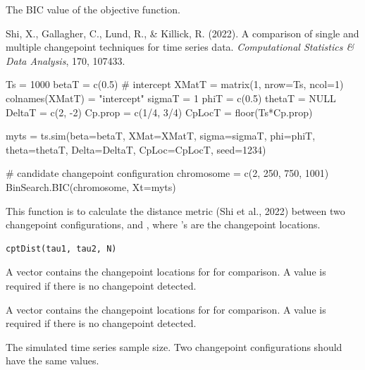 \documentclass[a4paper]{book}
\begin{document}
%
\begin{Value}
The BIC value of the objective function.
\end{Value}
%
\begin{References}

Shi, X., Gallagher, C., Lund, R., \& Killick, R. (2022).
A comparison of single and multiple changepoint techniques for time series data.
\emph{Computational Statistics \& Data Analysis}, 170, 107433.

\end{References}
%
\begin{Examples}
\begin{ExampleCode}
Ts = 1000
betaT = c(0.5) # intercept
XMatT = matrix(1, nrow=Ts, ncol=1)
colnames(XMatT) = "intercept"
sigmaT = 1
phiT = c(0.5)
thetaT = NULL
DeltaT = c(2, -2)
Cp.prop = c(1/4, 3/4)
CpLocT = floor(Ts*Cp.prop)

myts = ts.sim(beta=betaT, XMat=XMatT, sigma=sigmaT, phi=phiT, theta=thetaT,
              Delta=DeltaT, CpLoc=CpLocT, seed=1234)

# candidate changepoint configuration
chromosome = c(2, 250, 750, 1001)
BinSearch.BIC(chromosome, Xt=myts)
\end{ExampleCode}
\end{Examples}
%
\begin{Description}
This function is to calculate the distance metric (Shi et al., 2022) between
two changepoint configurations, 
and , where \eqn{\tau}{}'s are the
changepoint locations.
\end{Description}
%
\begin{Usage}
\begin{verbatim}
cptDist(tau1, tau2, N)
\end{verbatim}
\end{Usage}
%
\begin{Arguments}
\begin{ldescription}
\item[\code{tau1}] A vector contains the changepoint locations for 
for comparison. A value  is required if there is no changepoint detected.

\item[\code{tau2}] A vector contains the changepoint locations for  
for comparison. A value  is required if there is no changepoint detected.

\item[\code{N}] The simulated time series sample size. Two changepoint configurations
should have the same  values.
\end{ldescription}
\end{Arguments}
\end{document}
